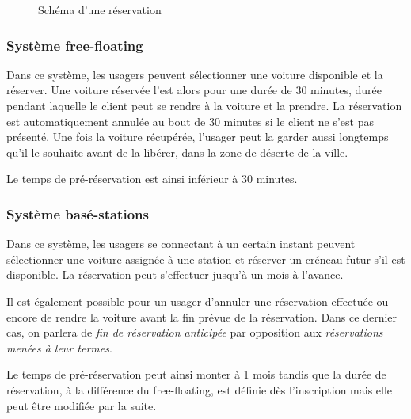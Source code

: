 \documentclass[12pt,a4paper]{article}
\newcommand{\1}[1]{\mathbbm{1}_{\{#1\}} }
\theoremstyle{definition}
\begin{document}
\begin{figure}[h]
\centering
{}
\caption{Schéma d'une réservation}
\end{figure}


\subsubsection{Système free-floating}

Dans ce système, les usagers peuvent sélectionner une voiture disponible et la réserver. Une voiture réservée l'est alors pour une durée de 30 minutes, durée pendant laquelle le client peut se rendre à la voiture et la prendre. La réservation est automatiquement annulée au bout de 30 minutes si le client ne s'est pas présenté. Une fois la voiture récupérée, l'usager peut la garder aussi longtemps qu'il le souhaite avant de la libérer, dans la zone de déserte de la ville.

Le temps de pré-réservation est ainsi inférieur à 30 minutes.

\subsubsection{Système basé-stations}

Dans ce système, les usagers se connectant à un certain instant peuvent sélectionner une voiture assignée à une station et réserver un créneau futur s'il est disponible. La réservation peut s'effectuer jusqu'à un mois à l'avance.

Il est également possible pour un usager d'annuler une réservation effectuée ou encore de rendre la voiture avant la fin prévue de la réservation. Dans ce dernier cas, on parlera de \emph{fin de réservation anticipée} par opposition aux \emph{réservations menées à leur termes}.

Le temps de pré-réservation peut ainsi monter à 1 mois tandis que la durée de réservation, à la différence du free-floating, est définie dès l'inscription mais elle peut être modifiée par la suite.
\end{document}
